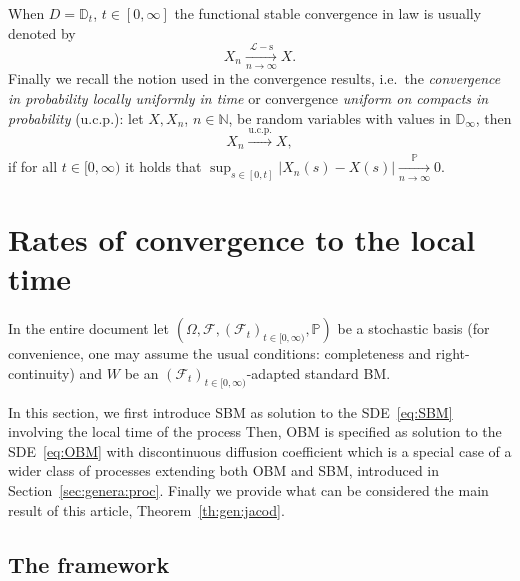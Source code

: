 \documentclass[12pt]{article}
\numberwithin{equation}{section}
\theoremstyle{definition}
\theoremstyle{remark}
\newcommand{\convp}[1][]{\xrightarrow[#1]{\PP}}
\newcommand{\convsl}[1][]{\xrightarrow[#1]{\mathcal{L}-\mathrm{s}}}
\newcommand{\convucp}[1][]{\xrightarrow[#1]{\mathrm{u.c.p.}}}
\newcommand{\NN}{\mathbb{N}}
\newcommand{\RR}{\mathbb{R}}
\newcommand{\PP}{\mathbb{P}}
\begin{document}
When $D=\mathbb{D}_t$, $t\in [0,\infty]$ the functional stable convergence in law is usually denoted by
\begin{equation}X_n \convsl[n\to \infty] X.\end{equation}
%
Finally we recall the
notion used in the convergence results, i.e.~the {\em convergence in probability locally uniformly in time\/} or convergence {\em uniform on compacts in probability\/} (u.c.p.): 
let $X,X_n$, $n\in \NN$, be random variables with values in $\mathbb{D}_\infty$,
then
\begin{equation}X_n \convucp X,\end{equation} 
if for all $t\in [0,\infty)$ it holds that
$
	\sup_{s\in [0,t]} \left|  X_n(s) - X(s) \right| 
	\convp[n\to\infty] 0.
$










\section{Rates of convergence to the local time} \label{sec:main}


In the entire document
let $(\Omega,\mathcal{F}, (\mathcal{F}_t)_{t\in [0,\infty)},\PP)$ be a stochastic basis (for convenience, one may assume the usual conditions: completeness and right-continuity) 
and $W$ be an $(\mathcal{F}_t)_{t\in [0,\infty)}$-adapted standard BM.


In this section, we first introduce 
SBM as solution to the SDE~\eqref{eq:SBM} involving the local time of the process 
Then, OBM is specified as solution to the SDE~\eqref{eq:OBM} with discontinuous diffusion coefficient which is a special case of a wider class of processes extending both OBM and SBM, introduced in Section~\ref{sec:genera:proc}.
Finally we provide what can be considered the main result of this article, Theorem~\ref{th:gen:jacod}.
%
%

\subsection{The framework} \label{sec:main:processes}
\end{document}

